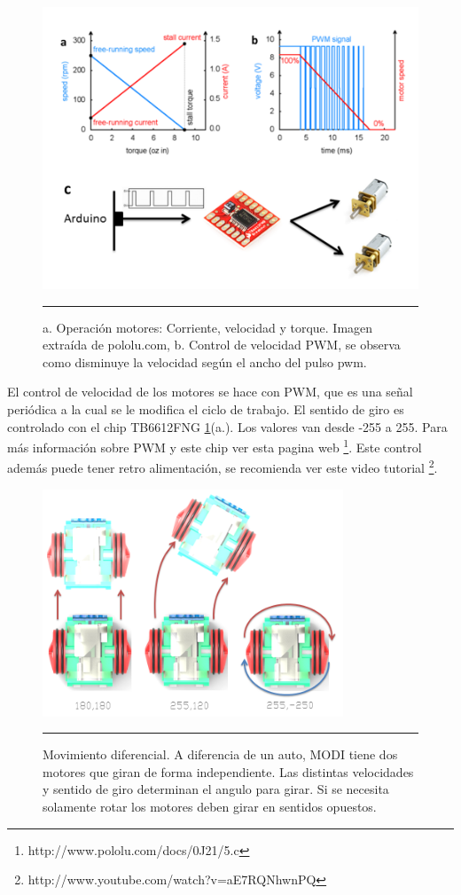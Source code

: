 \begin{figure}[htbp]
	\centering
		\includegraphics[width=\textwidth]{./Figures/graficosMotores.png}
		\rule{35em}{0.5pt}
	\caption[Gráficos Motor DC]{a. Operación motores: Corriente, velocidad y torque. Imagen extraída de pololu.com, b. Control de velocidad PWM, se observa como disminuye la velocidad según el ancho del pulso pwm.}
	\label{fig:DCMotor}
\end{figure}

El control de velocidad de los motores se hace con PWM, que es una señal periódica a la cual se le modifica el ciclo de trabajo. El sentido de giro es controlado con el chip TB6612FNG \ref{fig:DCMotor}(a.). Los valores van desde -255 a 255. Para más información sobre PWM y este chip ver esta pagina web \footnote{http://www.pololu.com/docs/0J21/5.c}. Este control además puede tener retro alimentación, se recomienda ver este video tutorial \footnote{http://www.youtube.com/watch?v=aE7RQNhwnPQ}.

\begin{figure}[htbp]
	\centering
		\includegraphics[width=0.8\textwidth]{./Figures/MODI/pwm.png}
		\rule{35em}{0.5pt}
	\caption[pwm]{Movimiento diferencial. A diferencia de un auto, MODI tiene dos motores que giran de forma independiente. Las distintas velocidades y sentido de giro determinan el angulo para girar. Si se necesita solamente rotar los motores deben girar en sentidos opuestos.}
	\label{fig:pwm}
\end{figure}

